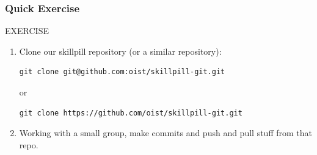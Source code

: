 \documentclass{beamer}
\begin{document}
\begin{frame}[fragile]
\frametitle{Quick Exercise}
    \begin{block}{EXERCISE}
        \begin{enumerate}
        \item Clone our skillpill repository (or a similar repository):
        \begin{lstlisting}
git clone git@github.com:oist/skillpill-git.git
        \end{lstlisting}
        or
        \begin{lstlisting}
git clone https://github.com/oist/skillpill-git.git
        \end{lstlisting}
        \item Working with a small group, make commits and push and pull stuff from that repo.
        \end{enumerate}
    \end{block}

\end{frame}
\end{document}
